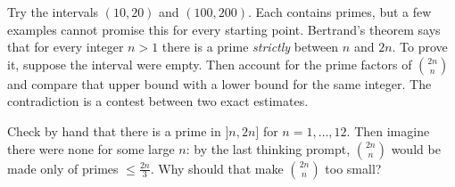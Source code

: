 Try the intervals $(10,20)$ and $(100,200)$. Each contains primes, but a few examples cannot promise this for every starting point. Bertrand's theorem says that for every integer $n>1$ there is a prime \emph{strictly} between $n$ and $2n$. To prove it, suppose the interval were empty. Then account for the prime factors of $\binom{2n}{n}$ and compare that upper bound with a lower bound for the same integer. The contradiction is a contest between two exact estimates.

\begin{think}
Check by hand that there is a prime in $]n,2n]$ for $n=1,\dots,12$. Then imagine there were none for some large $n$: by the last thinking prompt, $\binom{2n}n$ would be made only of primes $\le\frac{2n}3$. Why should that make $\binom{2n}n$ too small?
\end{think}

